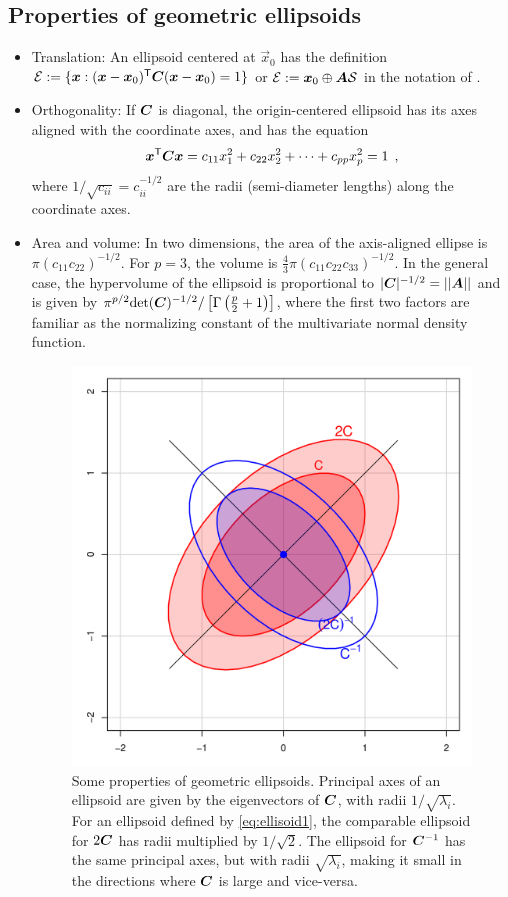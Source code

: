 \subsection{Properties of geometric ellipsoids}\label{sec:properties}

\begin{itemize}
 \item Translation: An ellipsoid centered at $\vec{x}_0$ has the definition $\mathcal{E} := \{ \bm{x}: (\bm{x}-\bm{x}_0)^\mathsf{T} \bm{C} (\bm{x}-\bm{x}_0) =1
 \}$ or $\mathcal{E} := \bm{x}_0 \oplus\bm{A} \mathcal{S}$ in the notation of .

 \item Orthogonality: If $\bm{C}$ is diagonal, the origin-centered ellipsoid has its axes aligned with the coordinate axes, and
has the equation
\begin{equation}\label{eq:ellisoid2}
 \bm{x}^\mathsf{T} \bm{C} \bm{x} = c_{11} x_1^2 + c_{22} x_2^2 + \cdots + c_{pp} x_p^2 =1 \:\: ,
\end{equation}
where $1/\sqrt{c_{ii}} = c_{ii}^{-1/2}$ are the radii (semi-diameter lengths) along the coordinate axes.

 \item Area and volume: In two dimensions, the area of the axis-aligned ellipse is $\pi (c_{11} c_{22})^{-1/2}$.
 For $p=3$, the volume is $\frac{4}{3}\pi (c_{11} c_{22} c_{33})^{-1/2}$.
 In the general case, the hypervolume of the ellipsoid is proportional to $|\bm{C}|^{-1/2}=||\bm{A}||$
 and is given by $\pi^{p/2} \mathrm{det} (\bm{C})^{-1/2} / \left[  \Gamma\left(\frac{p}{2}+1\right) \right]$,
 where the first two factors are familiar as the normalizing constant of the multivariate normal 
 density function.

\begin{figure}[tb]
  \centering
  \includegraphics[width=.5\textwidth,clip]{fig/inverse}
  \caption{Some properties of geometric ellipsoids. Principal axes of an ellipsoid are given by the eigenvectors of
  $\bm{C}$, with radii $1/\sqrt{\lambda_i}$.  For an ellipsoid defined by \eqref{eq:ellisoid1},
  the comparable ellipsoid for $2\bm{C}$ has radii multiplied by $1/\sqrt{2}$.
  The ellipsoid for $\bm{C}^{-1}$ has the same principal axes, but with radii $\sqrt{\lambda_i}$, making it
  small in the directions where $\bm{C}$ is large and vice-versa.
  } \label{fig:inverse}
\end{figure}


\end{itemize}
